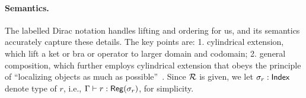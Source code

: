 
\paragraph*{Semantics.} 
The labelled Dirac notation handles lifting and ordering for us, and its semantics accurately capture these details. The key points are: 1. cylindrical extension, which lift a ket or bra or operator to larger domain and codomain; 2. general composition, which further employs cylindrical extension that obeys the principle of ``localizing objects as much as possible''~\cite{Zhou2023}.
Since $\mathcal{R}$ is given, we let $\sigma_r : \mathsf{Index}$ denote type of $r$, i.e.,  $\Gamma\vdash r : \mathsf{Reg}(\sigma_r)$, for simplicity.

